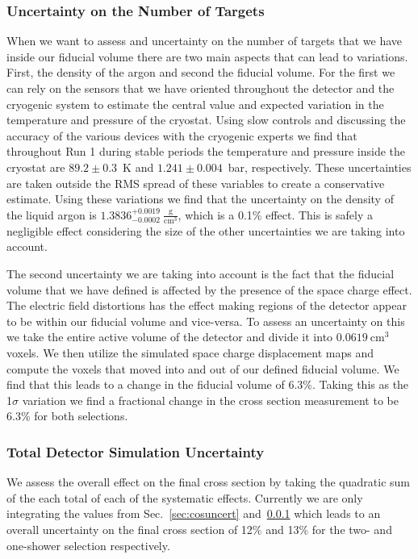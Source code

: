 \documentclass{article}
\begin{document}
\subsubsection{Uncertainty on the Number of Targets}\label{sec:ntarguncert}

When we want to assess and uncertainty on the number of targets that we have inside our fiducial volume there are two main aspects that can lead to variations. First, the density of the argon and second the fiducial volume. For the first we can rely on the sensors that we have oriented throughout the detector and the cryogenic system to estimate the central value and expected variation in the temperature and pressure of the cryostat. Using slow controls and discussing the accuracy of the various devices with the cryogenic experts we find that throughout Run 1 during stable periods the temperature and pressure inside the cryostat are $89.2  \pm 0.3$~K and $1.241 \pm 0.004$~bar, respectively. These uncertainties are taken outside the RMS spread of these variables to create a conservative estimate. Using these variations we find that the uncertainty on the density of the liquid argon is $1.3836^{+0.0019}_{-0.0002}~\frac{\text{g}}{\text{cm}^3}$, which is a 0.1\% effect. This is safely a negligible effect considering the size of the other uncertainties we are taking into account.

The second uncertainty we are taking into account is the fact that the fiducial volume that we have defined is affected by the presence of the space charge effect. The electric field distortions has the effect making regions of the detector appear to be within our fiducial volume and vice-versa. To assess an uncertainty on this we take the entire active volume of the detector and divide it into $0.0619~\text{cm}^3$ voxels. We then utilize the simulated space charge displacement maps and compute the voxels that moved into and out of our defined fiducial volume. We find that this leads to a change in the fiducial volume of 6.3\%. Taking this as the 1$\sigma$ variation we find a fractional change in the cross section measurement to be 6.3\% for both selections. 


\subsubsection{Total Detector Simulation Uncertainty}
	
We assess the overall effect on the final cross section by taking the quadratic sum of the each total of each of the systematic effects. Currently we are only integrating the values from Sec.~\ref{sec:cosuncert} and~\ref{sec:ntarguncert} which leads to an overall uncertainty on the final cross section of 12\% and 13\% for the two- and one-shower selection respectively. 
\end{document}
